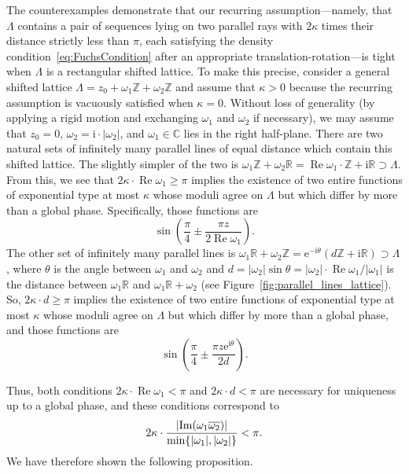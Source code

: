 \documentclass{article}
\newcommand{\bbZ}{\mathbb{Z}}
\DeclarePairedDelimiter{\abs}{\lvert}{\rvert}
\renewcommand{\Re}{\operatorname{Re}}
\renewcommand{\Im}{\operatorname{Im}}
\theoremstyle{remark}
\begin{document}
    The counterexamples demonstrate that our recurring assumption---namely, that $\Lambda$ contains a pair of sequences lying on two parallel rays with $2 \kappa$ times their distance strictly less than $\pi$, each satisfying the density condition~\eqref{eq:FuchsCondition} after an appropriate translation-rotation---is tight when $\Lambda$ is a rectangular shifted lattice. To make this precise, consider a general shifted lattice $\Lambda = z_0 + \omega_1 \bbZ + \omega_2 \bbZ$ and assume that $\kappa > 0$ because the recurring assumption is vacuously satisfied when $\kappa = 0$. Without loss of generality (by applying a rigid motion and exchanging $\omega_1$ and $\omega_2$ if necessary), we may assume that $z_0 = 0$, $\omega_2 = \mathrm i \cdot \lvert \omega_2 \rvert$, and $\omega_1 \in \mathbb{C}$ lies in the right half-plane. There are two natural sets of infinitely many parallel lines of equal distance which contain this shifted lattice. The slightly simpler of the two is $\omega_1 \mathbb Z + \omega_2 \mathbb R = \Re \omega_1 \cdot \mathbb Z + \mathrm i \mathbb R \supset \Lambda$. From this, we see that $2 \kappa \cdot \Re \omega_1 \geq \pi$ implies the existence of two entire functions of exponential type at most $\kappa$ whose moduli agree on $\Lambda$ but which differ by more than a global phase. Specifically, those functions are 
    \begin{equation*}
        \sin\left( \frac{\pi}{4} \pm \frac{\pi z}{2 \Re \omega_1} \right).
    \end{equation*}
    The other set of infinitely many parallel lines is $\omega_1 \mathbb R + \omega_2 \mathbb Z = \mathrm e^{-\mathrm i \theta}(d \mathbb Z + \mathrm i \mathbb R) \supset \Lambda$, where $\theta$ is the angle between $\omega_1$ and $\omega_2$ and $d = \lvert \omega_2 \rvert \sin \theta = \lvert \omega_2 \rvert \cdot \Re \omega_1 / \lvert \omega_1 \rvert$ is the distance between $\omega_1 \mathbb R$ and $\omega_1 \mathbb R + \omega_2$ (see Figure~\ref{fig:parallel_lines_lattice}). So, $2 \kappa \cdot d \geq \pi$ implies the existence of two entire functions of exponential type at most $\kappa$ whose moduli agree on $\Lambda$ but which differ by more than a global phase, and those functions are 
    \begin{equation*}
        \sin\left( \frac{\pi}{4} \pm \frac{\pi z \mathrm e^{\mathrm i \theta}}{2 d} \right).
    \end{equation*}

    Thus, both conditions $2 \kappa \cdot \Re \omega_1 < \pi$ and $2 \kappa \cdot d < \pi$ are necessary for uniqueness up to a global phase, and these conditions correspond to 
    \begin{equation*}
        2 \kappa \cdot \frac{\abs{\Im(\omega_1 \overline{\omega_2})}}{\min\lbrace \abs{\omega_1}, \abs{\omega_2} \rbrace} < \pi.
    \end{equation*}
    We have therefore shown the following proposition.
\end{document}
